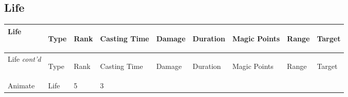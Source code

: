 \documentclass[twoside]{book}
\begin{document}
    

\subsection{Life}
    
\begin{longtable}{p{1.25in}lp{2em}p{3em}llp{7em}ll} 
  Life& \begin{turn}{70}{Type}\end{turn}
          & \begin{turn}{70}{Rank}\end{turn}
          & \begin{turn}{70}{Casting Time}\end{turn}
          & \begin{turn}{70}{Damage}\end{turn}
          & \begin{turn}{70}{Duration}\end{turn}
          & \begin{turn}{70}{Magic Points}\end{turn}
          & \begin{turn}{70}{Range}\end{turn}
          & \begin{turn}{70}{Target}\end{turn}
          \\
  \hline
  \hline
  \endfirsthead
  Life \textit{cont'd}
        & \begin{turn}{70}{Type}\end{turn}
          & \begin{turn}{70}{Rank}\end{turn}
          & \begin{turn}{70}{Casting Time}\end{turn}
          & \begin{turn}{70}{Damage}\end{turn}
          & \begin{turn}{70}{Duration}\end{turn}
          & \begin{turn}{70}{Magic Points}\end{turn}
          & \begin{turn}{70}{Range}\end{turn}
          & \begin{turn}{70}{Target}\end{turn}
           \\
  \hline
  \endhead
\raggedright Animate & Life & 5 & 3

\end{longtable}
\end{document}
